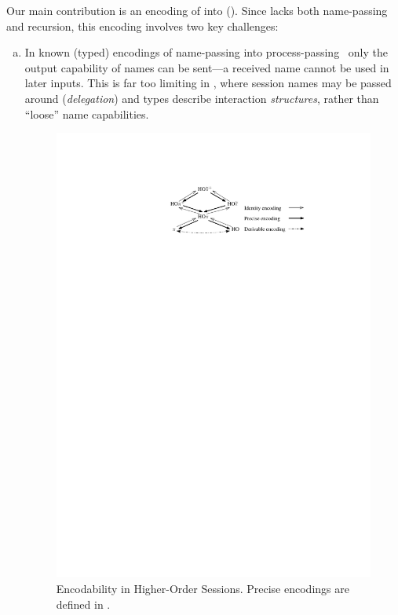 Our main contribution is 
an encoding of \HOp into \HO ().  
Since \HO lacks 
both name-passing and recursion, this encoding involves two key challenges:
\begin{enumerate}[a.]
\item In known (typed) 
encodings of name-passing into process-passing~\cite{SaWabook} %
only the output capability of names can be sent---a received name cannot be used in later inputs.
This is far too limiting in \HOp, where 
 session names %
 may be passed around (\emph{delegation})
and types describe interaction  \emph{structures}, rather than ``loose'' name capabilities. %

\begin{figure}[t]
\centering
\includegraphics[scale=1]{diag.pdf}
	\caption{Encodability in Higher-Order Sessions. 
	Precise encodings are defined in .
	\label{fig:express}}
\Hlinefig
\end{figure}


\end{enumerate}
